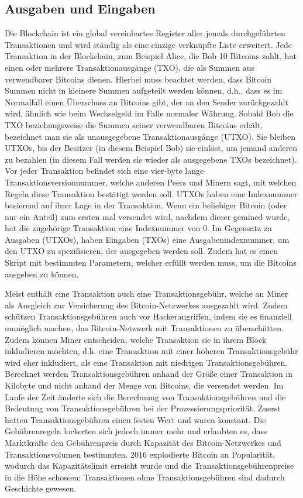 \subsection{Ausgaben und Eingaben}
Die Blockchain ist ein global vereinbartes Register aller jemals durchgeführten Transaktionen und wird ständig als eine einzige 
verknüpfte Liste erweitert. Jede Transaktion in der Blockchain, zum Beispiel Alice, die Bob 10 Bitcoins zahlt, hat einen oder
mehrere Transaktionausgänge (TXO), die als Summen aus verwendbarer Bitcoins dienen. Hierbei muss beachtet werden, dass Bitcoin
Summen nicht in kleinere Summen aufgeteilt werden können, d.h., dass es im Normalfall einen Überschuss an Bitcoins gibt, der an 
den Sender zurückgezahlt wird, ähnlich wie beim Wechselgeld im Falle normaler Währung. Sobald Bob die TXO beziehungsweise 
die Summen seiner verwendbaren Bitcoins erhält, bezeichnet man sie als unausgegebene Transaktionausgänge (UTXO). Sie bleiben
UTXOs, bis der Besitzer (in diesem Beispiel Bob) sie einlöst, um jemand anderen zu bezahlen (in diesem Fall werden sie wieder
als ausgegebene TXOs bezeichnet).  Vor jeder Transaktion befindet sich eine vier-byte lange
Transaktionsversionnummer, welche anderen Peers und Minern sagt, mit welchen Regeln diese Transaktion bestätigt werden soll.
UTXOs haben eine Indexnummer basierend auf ihrer Lage in der Transaktion. Wenn ein beliebiger Bitcoin (oder nur ein Anteil)
zum ersten mal versendet wird, nachdem dieser gemined wurde, hat die zugehörige Transaktion eine Indexnummer von 0. Im Gegensatz
zu Ausgaben (UTXOs), haben Eingaben (TXOs) eine Ausgabenindexnummer, um den UTXO zu spezifisieren, der ausgegeben werden soll.
Zudem hat es einen Skript mit bestimmten Parametern, welcher erfüllt werden muss, um die Bitcoins ausgeben zu können.

Meist enthält eine Transaktion auch eine Transaktionsgebühr, welche an Miner als Ausgleich zur Versicherung des Bitcoin-Netzwerkes
ausgezahlt wird. Zudem schützen Transaktionsgebühren auch vor Hackerangriffen, indem sie es finanziell unmöglich machen, das 
Bitcoin-Netzwerk mit Transaktionen zu überschütten. Zudem können Miner entscheiden, welche Transaktion sie in ihrem Block
inkludieren möchten, d.h. eine Transaktion mit einer höheren Transaktionsgebühr wird eher inkludiert, als eine Transaktion mit
niedrigen Transaktionsgebühren. Berechnet werden Transaktionsgebühren anhand der Größe einer Transaktion in Kilobyte und nicht 
anhand der Menge von Bitcoins, die versendet werden. Im Laufe der Zeit änderte sich die Berechnung von Transaktionsgebühren
und die Bedeutung von Transaktionsgebühren bei der Prozessierungspriorität. Zuerst hatten Transaktionsgebühren einen festen 
Wert und waren konstant. Die Gebührenregeln lockerten sich jedoch immer mehr und erlaubten es, dass Marktkräfte den
Gebührenpreis durch Kapazität des Bitcoin-Netzwerkes und Transaktionsvolumen bestimmten. 2016 explodierte Bitcoin an Popularität,
wodurch das Kapazitätslimit erreicht wurde und die Transaktionsgebührenpreise in die Höhe schossen; Transaktionen ohne
Transaktionsgebühren sind dadurch Geschichte gewesen. 


